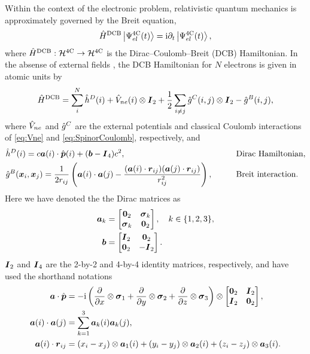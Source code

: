 Within the context of the electronic problem, relativistic quantum mechanics is approximately governed
by the Breit equation,
\begin{equation}
\label{eq:BreitEq}
\hat{H}^{\mathrm{DCB}} \left\vert \Psi^{\mathrm{4C}}_{el} (t) \right\rangle = \mathrm i \partial_t \left\vert \Psi^{\mathrm{4C}}_{el} (t) \right\rangle,
\end{equation}
where $\hat{H}^{\mathrm{DCB}} : \mathcal{H}^{\mathrm{4C}} \rightarrow \mathcal{H}^{\mathrm{4C}}$ is the Dirac--Coulomb--Breit (DCB) Hamiltonian.
In the absense of external fields , the DCB Hamiltonian for $N$ electrons is given in atomic units by 
\begin{equation}
  \label{eq:DCBHam}
  \hat{H}^{\mathrm{DCB}} = \sum_i^N  \hat{h}^D(i) + \hat{V}_{ne}(i) \otimes \boldsymbol{I}_2 + \frac{1}{2} \sum_{i \neq j}\hat{g}^C(i,j) \otimes \boldsymbol{I}_2 
  - \hat{g}^B(i,j),
\end{equation}
where $\hat{V}_{ne}$ and $\hat{g}^C$ are the external potentials and classical Coulomb interactions of \cref{eq:Vne} and 
\cref{eq:SpinorCoulomb}, respectively, and
\begin{alignat}{2}
&\op{h}^D(i) = 
c \vc{a}(i) \cdot \op{\vc {p}}(i) + (\vc{b} - \vc{I}_4) c^2, \qquad &&\text{Dirac Hamiltonian}, \label{eq:DiracHam}\\
%
  &\op{g}^B(\vc{x}_i,\vc{x}_j) = \frac{1}{2r_{ij}} \left( \vc{a}(i)\cdot\vc{a}(j) - \frac{(\vc{a}(i) \cdot \vc{r}_{ij}) (\vc{a}(j) \cdot \vc{r}_{ij})}{r_{ij}^2}\right), 
\qquad && \text{Breit interaction}. \label{eq:BreitInt}
\end{alignat}
Here we have denoted the the Dirac matrices as
\begin{align}
  \boldsymbol{a}_k &= \begin{bmatrix} \boldsymbol{0}_2 & \boldsymbol{\sigma}_{k} \\ \boldsymbol{\sigma}_{k} & \boldsymbol{0}_2 \end{bmatrix}, \quad k \in \{1,2,3\},\\
  \boldsymbol{b} &= \begin{bmatrix} \boldsymbol{I}_2 & \boldsymbol{0}_2 \\ \boldsymbol{0}_2 & -\boldsymbol{I}_2 \end{bmatrix}.
\end{align}
$\boldsymbol{I}_2$ and $\boldsymbol{I}_4$ are the 2-by-2 and 4-by-4 identity matrices, respectively, and have used the shorthand notations
\begin{align}
  \boldsymbol{a} \cdot \hat{\boldsymbol{p}}  &= -\mathrm i \left( \frac{\partial}{\partial x} \otimes \boldsymbol{\sigma}_{1} + \frac{\partial}{\partial y} \otimes \boldsymbol{\sigma}_{2} + \frac{\partial}{\partial z} \otimes \boldsymbol{\sigma}_{3} 
    \right) \otimes \begin{bmatrix} \boldsymbol{0}_2 & \boldsymbol{I}_2 \\ \boldsymbol{I}_2 & \boldsymbol{0}_2 \end{bmatrix}, \\
  \boldsymbol{a}(i) \cdot \boldsymbol{a}(j) &= \sum_{k = 1}^3 \boldsymbol{a}_k(i) \boldsymbol{a}_k(j), \\
  \boldsymbol{a}(i) \cdot \boldsymbol{r}_{ij} &= (x_i - x_j) \otimes \boldsymbol{a}_1(i) + (y_i - y_j) \otimes \boldsymbol{a}_2(i) + (z_i - z_j) \otimes \boldsymbol{a}_3(i).
\end{align}
